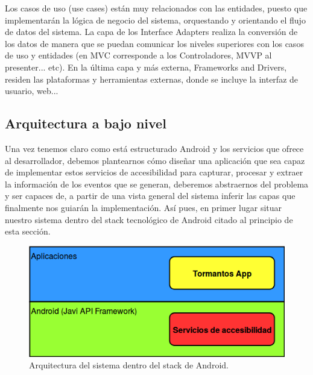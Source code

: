 \documentclass[12pt,a4paper,oneside]{book} %
\begin{document}
Los casos de uso (use cases) están muy relacionados con las entidades, puesto que implementarán la lógica de negocio del sistema, orquestando y orientando el flujo de datos del sistema. 
\newline
\newline
La capa de los Interface Adapters realiza la conversión de los datos de manera que se puedan comunicar los niveles superiores con los casos de uso y entidades (en MVC corresponde a los Controladores, MVVP al presenter... etc). 
\newline
\newline
En la última capa y más externa, Frameworks and Drivers, residen las plataformas y herramientas externas, donde se incluye la interfaz de usuario, web... 
\subsection{Arquitectura a bajo nivel}
Una vez tenemos claro como está estructurado Android y los servicios que ofrece al desarrollador, debemos plantearnos cómo diseñar una aplicación que sea capaz de implementar estos servicios de accesibilidad para capturar, procesar y extraer la  información de los eventos que se generan, deberemos abstraernos del problema y ser capaces de, a partir de una vista general del sistema inferir las capas que finalmente nos guiarán la implementación. 
\newline
\newline
Así pues, en primer lugar situar nuestro sistema dentro del stack tecnológico de Android citado al principio de esta sección. 
\newline
\begin{figure}[H]
	\begin{center}
		\includegraphics[scale=0.7]{pictures/architecture/arquitecturaGeneral01.png} 
	\end{center}
	\caption[Arquitectura dentro del android stack]{Arquitectura del sistema dentro del stack de Android.}
\end{figure}
\end{document}
